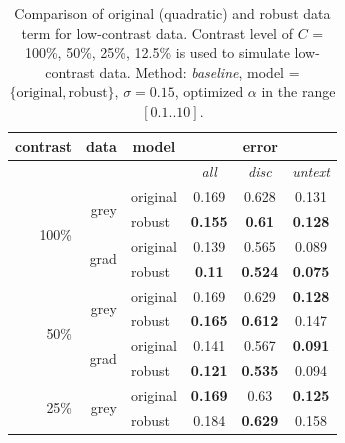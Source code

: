 \begin{table}[ht] \scriptsize
  \centering
  \caption{Comparison of original (quadratic) and robust data term for low-contrast data. Contrast level of $C$ = 100\%, 50\%, 25\%, 12.5\% is used to simulate low-contrast data. Method: \textit{baseline}, model = $\lbrace \text{original}, \text{robust} \rbrace$, $\sigma=0.15$, optimized $\alpha$ in the range $[0.1 .. 10]$.}
    \begin{tabular}{crrcrr}
    \toprule
    \multicolumn{1}{c}{contrast} & \multicolumn{1}{c}{data} & \multicolumn{1}{c}{model} & \multicolumn{3}{c}{error} \\
    \midrule
          &       &       & \textit{all} & \multicolumn{1}{c}{\textit{disc}} & \multicolumn{1}{c}{\textit{untext}} \\
          \midrule
          \midrule
          
    \multicolumn{1}{r}{\multirow{4}[0]{*}{100\%}} & \multicolumn{1}{r}{\multirow{2}[0]{*}{grey}} & \multicolumn{1}{l}{original} & 0.169 & \multicolumn{1}{c}{0.628} & \multicolumn{1}{c}{0.131} \\
          &       & \multicolumn{1}{l}{robust} & \textbf{0.155} & \multicolumn{1}{c}{\textbf{0.61}} & \multicolumn{1}{c}{\textbf{0.128}} \\
          & \multicolumn{1}{r}{\multirow{2}[0]{*}{grad}} & \multicolumn{1}{l}{original} & 0.139 & \multicolumn{1}{c}{0.565} & \multicolumn{1}{c}{0.089} \\
          &       & \multicolumn{1}{l}{robust} & \textbf{0.11} & \multicolumn{1}{c}{\textbf{0.524}} & \multicolumn{1}{c}{\textbf{0.075}} \\
          \midrule
          
    \multicolumn{1}{r}{\multirow{4}[0]{*}{50\%}} & \multicolumn{1}{r}{\multirow{2}[0]{*}{grey}} & \multicolumn{1}{l}{original} & 0.169 & \multicolumn{1}{c}{0.629} & \multicolumn{1}{c}{\textbf{0.128}} \\
          &       & \multicolumn{1}{l}{robust} & \textbf{0.165} & \multicolumn{1}{c}{\textbf{0.612}} & \multicolumn{1}{c}{0.147} \\
          & \multicolumn{1}{r}{\multirow{2}[0]{*}{grad}} & \multicolumn{1}{c}{original} & 0.141 & \multicolumn{1}{c}{0.567} & \multicolumn{1}{c}{\textbf{0.091}} \\
          &       & \multicolumn{1}{l}{robust} & \textbf{0.121} & \multicolumn{1}{c}{\textbf{0.535}} & \multicolumn{1}{c}{0.094} \\
          \midrule
    \multicolumn{1}{r}{\multirow{4}[0]{*}{25\%}} & \multicolumn{1}{r}{\multirow{2}[0]{*}{grey}} & \multicolumn{1}{l}{original} & \textbf{0.169} & \multicolumn{1}{c}{0.63} & \multicolumn{1}{c}{\textbf{0.125}} \\
          &       & \multicolumn{1}{l}{robust} & 0.184 & \multicolumn{1}{c}{\textbf{0.629}} & \multicolumn{1}{c}{0.158} \\        
          

\end{tabular}
\end{table}
